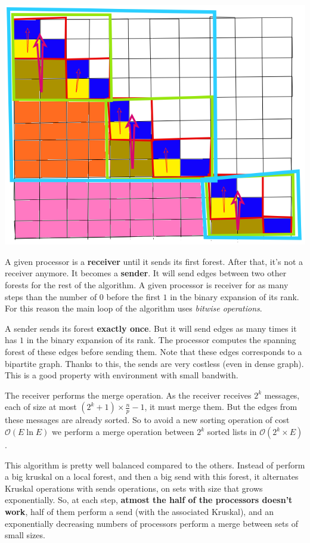 \documentclass[a4paper, 10pt]{article}
\begin{document}
\begin{center}
\includegraphics[scale=0.28]{final.png}  
\end{center}
  
A given processor is a \textbf{receiver} until it sends its first forest. After that, it's not a receiver anymore. It becomes a \textbf{sender}. It will send edges between two other forests for the rest of the algorithm. A given processor is receiver for as many steps than the number of $0$ before the first $1$ in the binary expansion of its rank. For this reason the main loop of the algorithm uses \textit{bitwise operations}.  
  
A sender sends its forest \textbf{exactly once}. But it will send edges as many times it has $1$ in the binary expansion of its rank. The processor computes the spanning forest of these edges before sending them. Note that these edges corresponds to a bipartite graph. Thanks to this, the sends are very costless (even in dense graph). This is a good property with environment with small bandwith.  
  
The receiver performs the merge operation. As the receiver receives $2^k$ messages, each of size at most $(2^k+1)\times\frac{n}{p}-1$, it must merge them. But the edges from these messages are already sorted. So to avoid a new sorting operation of cost $\mathcal{O}(E\ln{E})$ we perform a merge operation between $2^k$ sorted lists in $\mathcal{O}(2^k\times E)$.   
  
This algorithm is pretty well balanced compared to the others. Instead of perform a big kruskal on a local forest, and then a big send with this forest, it alternates Kruskal operations with sends operations, on sets with size that grows exponentially. So, at each step, \textbf{atmost the half of the processors doesn't work}, half of them perform a send (with the associated Kruskal), and an exponentially decreasing numbers of processors perform a merge between sets of small sizes.  
  
\end{document}
